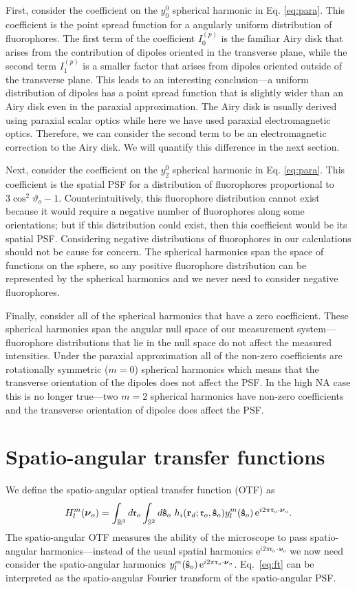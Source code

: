 \documentclass[11pt]{article}
\newcommand{\me}{\mathrm{e}}
\providecommand{\ro}[1]{\mathbf{\mathfrak{r}}_o}
\providecommand{\so}[1]{\mathbf{\hat{s}}_o}
\providecommand{\rd}[1]{\mathbf{r}_d}
\providecommand{\bs}[1]{\boldsymbol{#1}}
\begin{document}
First, consider the coefficient on the $y_0^0$ spherical harmonic in
Eq. \ref{eq:para}. This coefficient is the point spread function for a angularly
uniform distribution of fluorophores. The first term of the coefficient $I_0^{(p)}$
is the familiar Airy disk that arises from the contribution of dipoles oriented
in the transverse plane, while the second term $I_1^{(p)}$ is a smaller factor that
arises from dipoles oriented outside of the transverse plane. This leads to an
interesting conclusion---a uniform distribution of dipoles has a point spread
function that is slightly wider than an Airy disk even in the paraxial
approximation. The Airy disk is usually derived using paraxial scalar optics
while here we have used paraxial electromagnetic optics. Therefore, we can
consider the second term to be an electromagnetic correction to the Airy
disk. We will quantify this difference in the next section.

Next, consider the coefficient on the $y_2^0$ spherical harmonic in
Eq. \ref{eq:para}. This coefficient is the spatial PSF for a distribution of
fluorophores proportional to $3\cos^2\vartheta_o - 1$. Counterintuitively, this
fluorophore distribution cannot exist because it would require a negative number
of fluorophores along some orientations; but if this distribution could exist,
then this coefficient would be its spatial PSF. Considering negative
distributions of fluorophores in our calculations should not be cause for
concern. The spherical harmonics span the space of functions on the sphere, so
any positive fluorophore distribution can be represented by the spherical
harmonics and we never need to consider negative fluorophores.
    
Finally, consider all of the spherical harmonics that have a zero
coefficient. These spherical harmonics span the angular null space of our
measurement system---fluorophore distributions that lie in the null space do not
affect the measured intensities. Under the paraxial approximation all of the
non-zero coefficients are rotationally symmetric ($m=0$) spherical harmonics
which means that the transverse orientation of the dipoles does not affect the
PSF. In the high NA case this is no longer true---two $m=2$ spherical harmonics
have non-zero coefficients and the transverse orientation of dipoles does affect
the PSF.


\section{Spatio-angular transfer functions}
We define the spatio-angular optical transfer function (OTF) as
\begin{align}
  H_l^m(\bs{\nu}_o) = \int_{\mathbb{R}^3}d\ro{} \int_{\mathbb{S}^2}d\so{}\ h_i(\rd{}; \ro{}, \so{}) y_l^m(\so{})\thinspace\me^{i 2\pi \ro{}\cdot\bs{\nu}_o}. \label{eq:ft}
\end{align}
The spatio-angular OTF measures the ability of the microscope to pass
spatio-angular harmonics---instead of the usual spatial harmonics
$\me^{i 2\pi \ro{}\cdot\bs{\nu}_o}$ we now need consider the spatio-angular
harmonics $y_l^m(\so{})\thinspace\me^{i 2\pi
  \ro{}\cdot\bs{\nu}_o}$. Eq.~\ref{eq:ft} can be interpreted as the
spatio-angular Fourier transform of the spatio-angular PSF.
\end{document}
